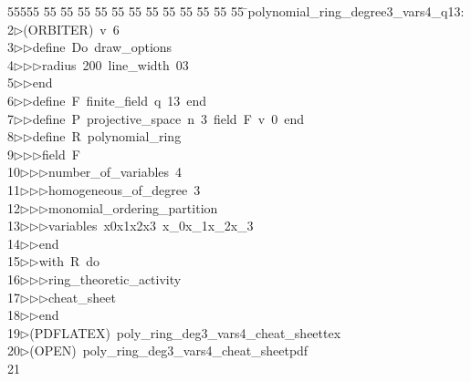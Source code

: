 %
%
\begin{tabbing}
55555 \= 55 \= 55 \= 55 \= 55 \= 55 \= 55 \= 55 \= 55 \= 55 \= 55 \= 55 \= 55 \= \>polynomial\_ring\_degree3\_vars4\_q13:\\[0pt]
2\>$\triangleright$\>(ORBITER)\ v\ 6\ \\[0pt]
3\>$\triangleright$\>$\triangleright$\>define\ Do\ draw\_options\ \\[0pt]
4\>$\triangleright$\>$\triangleright$\>$\triangleright$\>radius\ 200\ line\_width\ 03\ \\[0pt]
5\>$\triangleright$\>$\triangleright$\>end\ \\[0pt]
6\>$\triangleright$\>$\triangleright$\>define\ F\ finite\_field\ q\ 13\ end\ \\[0pt]
7\>$\triangleright$\>$\triangleright$\>define\ P\ projective\_space\ n\ 3\ field\ F\ v\ 0\ end\ \\[0pt]
8\>$\triangleright$\>$\triangleright$\>define\ R\ polynomial\_ring\ \\[0pt]
9\>$\triangleright$\>$\triangleright$\>$\triangleright$\>field\ F\ \\[0pt]
10\>$\triangleright$\>$\triangleright$\>$\triangleright$\>number\_of\_variables\ 4\ \\[0pt]
11\>$\triangleright$\>$\triangleright$\>$\triangleright$\>homogeneous\_of\_degree\ 3\ \\[0pt]
12\>$\triangleright$\>$\triangleright$\>$\triangleright$\>monomial\_ordering\_partition\ \\[0pt]
13\>$\triangleright$\>$\triangleright$\>$\triangleright$\>variables\ x0x1x2x3\ x\_0x\_1x\_2x\_3\ \\[0pt]
14\>$\triangleright$\>$\triangleright$\>end\ \\[0pt]
15\>$\triangleright$\>$\triangleright$\>with\ R\ do\ \\[0pt]
16\>$\triangleright$\>$\triangleright$\>$\triangleright$\>ring\_theoretic\_activity\ \\[0pt]
17\>$\triangleright$\>$\triangleright$\>$\triangleright$\>cheat\_sheet\ \\[0pt]
18\>$\triangleright$\>$\triangleright$\>end\\[0pt]
19\>$\triangleright$\>(PDFLATEX)\ poly\_ring\_deg3\_vars4\_cheat\_sheettex\\[0pt]
20\>$\triangleright$\>(OPEN)\ poly\_ring\_deg3\_vars4\_cheat\_sheetpdf\\[0pt]
21\>\end{tabbing}
